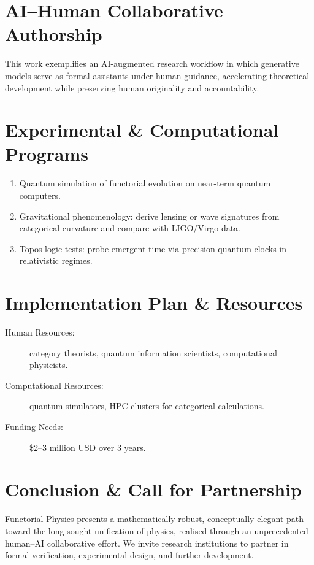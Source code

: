 \documentclass[11pt]{article}
\begin{document}
\section{AI–Human Collaborative Authorship}
This work exemplifies an AI-augmented research workflow in which generative models serve as formal assistants under human guidance, accelerating theoretical development while preserving human originality and accountability.

\section{Experimental \& Computational Programs}
\begin{enumerate}
\item Quantum simulation of functorial evolution on near-term quantum computers.
\item Gravitational phenomenology: derive lensing or wave signatures from categorical curvature and compare with LIGO/Virgo data.
\item Topos-logic tests: probe emergent time via precision quantum clocks in relativistic regimes.
\end{enumerate}

\section{Implementation Plan \& Resources}
\begin{description}
\item[Human Resources:] category theorists, quantum information scientists, computational physicists.
\item[Computational Resources:] quantum simulators, HPC clusters for categorical calculations.
\item[Funding Needs:] \$2--3 million USD over 3 years.
\end{description}

\section{Conclusion \& Call for Partnership}
Functorial Physics presents a mathematically robust, conceptually elegant path toward the long-sought unification of physics, realised through an unprecedented human–AI collaborative effort. We invite research institutions to partner in formal verification, experimental design, and further development.
\end{document}
